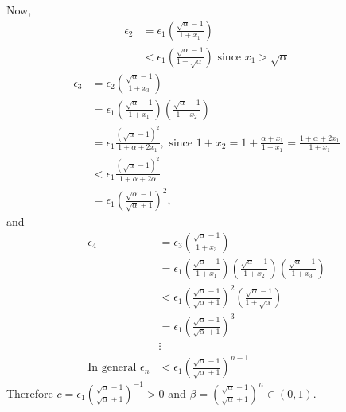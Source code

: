 \documentclass[11pt]{amsart}
\begin{document}
Now,
\begin{align*}
  \epsilon_{2} & = \epsilon_{1}\left(\frac{\sqrt{\alpha} - 1}{1+x_{1}}\right) \\
  & < \epsilon_{1}\left(\frac{\sqrt{\alpha}-1}{1+\sqrt{\alpha}}\right) \text{ since } x_{1} > \sqrt{\alpha} 
\end{align*}
\begin{align*}
  \epsilon_{3} & = \epsilon_{2}\left(\frac{\sqrt{\alpha}-1}{1+x_{3}}\right)  \\
  & = \epsilon_{1}\left(\frac{\sqrt{\alpha}-1}{1+x_{1}}\right)\left(\frac{\sqrt{\alpha}-1}{1+x_{2}}\right) \\
  & = \epsilon_{1}\frac{(\sqrt{\alpha}-1)^{2}}{1 + \alpha + 2x_{1}}, \text{ since } 1+x_{2} = 1 + \frac{\alpha + x_{1}}{1 + x_{1}} = \frac{1 + \alpha + 2x_{1}}{1 + x_{1}} \\ 
  & < \epsilon_{1}\frac{(\sqrt{\alpha}-1)^{2}}{1 + \alpha + 2\alpha} \\
  & = \epsilon_{1}\left(\frac{\sqrt{\alpha}-1}{\sqrt{\alpha}+1}\right)^{2}, 
\end{align*}
and
\begin{align*}
  \epsilon_{4} & = \epsilon_{3}\left(\frac{\sqrt{\alpha}-1}{1+x_{3}}\right) \\
  & = \epsilon_{1} \left(\frac{\sqrt{\alpha}-1}{1+x_{1}}\right)\left(\frac{\sqrt{\alpha}-1}{1+x_{2}}\right)\left(\frac{\sqrt{\alpha}-1}{1+x_{3}}\right) \\
  & < \epsilon_{1} \left(\frac{\sqrt{\alpha}-1}{\sqrt{\alpha}+1}\right)^{2}\left(\frac{\sqrt{\alpha}-1}{1+\sqrt{\alpha}}\right) \\
  & = \epsilon_{1}\left(\frac{\sqrt{\alpha}-1}{\sqrt{\alpha}+1}\right)^{3} \\
  & \vdots \\
  \text{In general }\epsilon_{n} & < \epsilon_{1}\left(\frac{\sqrt{\alpha}-1}{\sqrt{\alpha}+1}\right)^{n-1}
\end{align*}
Therefore $c = \epsilon_{1}\left(\frac{\sqrt{\alpha}-1}{\sqrt{\alpha}+1}\right)^{-1} > 0$ and $\beta = \left(\frac{\sqrt{\alpha}-1}{\sqrt{\alpha}+1}\right)^{n} \in (0,1)$.
\end{document}
